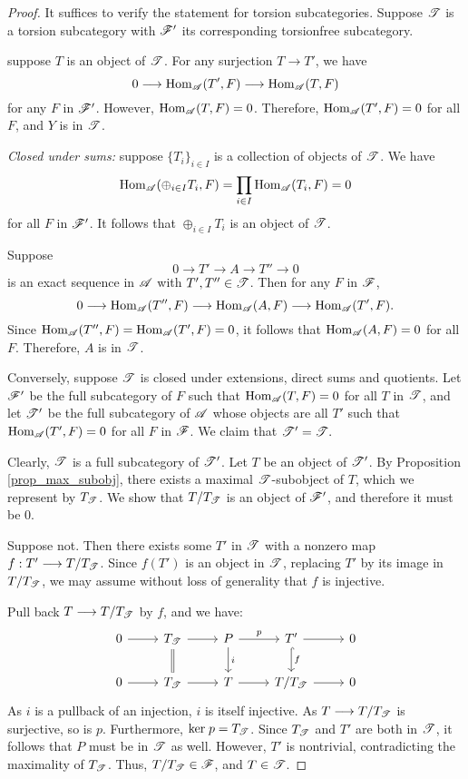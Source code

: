 \begin{proof}
It suffices to verify the statement for torsion subcategories.
Suppose $\mathscr{T}$ is a torsion subcategory with $\mathscr{F}'$ its 
corresponding torsionfree subcategory. 

 suppose $T$ is an object of 
$\mathscr{T}$. For any surjection $T \to T'$, we have 
\[
0 \longrightarrow \mathrm{Hom}_{\mathscr{A}}(T', F) \longrightarrow \mathrm{Hom}_{\mathscr{A}}(T, F)
\]
for any $F$ in $\mathscr{F}'$. However, $\mathrm{Hom}_{\mathscr{A}}(T, F) = 0$.
Therefore, $\mathrm{Hom}_{\mathscr{A}}(T', F) = 0$ for all $F$, and $Y$ is
in $\mathscr{T}$.

\emph{Closed under sums:} suppose $\{T_i\}_{i \in I}$ is a 
collection of objects of $\mathscr{T}$. We have
\[
\mathrm{Hom}_{\mathscr{A}}( \oplus_{i \in I} T_i, F) = \prod_{i \in I}
\mathrm{Hom}_{\mathscr{A}}( T_i, F) = 0
\]
for all $F$ in $\mathscr{F}'$. It follows that $\oplus_{i \in I} T_i$
is an object of $\mathscr{T}$.

 Suppose 
\[
0 \to T' \to A \to T'' \to 0
\]
is an exact sequence in $\mathscr{A}$ with $T', T'' \in \mathscr{T}$.
Then for any $F$ in $\mathscr{F}$, 
\[
0 \longrightarrow \mathrm{Hom}_{\mathscr{A}}(T'', F) \longrightarrow \mathrm{Hom}_{\mathscr{A}}(A, F) \longrightarrow
\mathrm{Hom}_{\mathscr{A}}(T', F).
\]
Since $\mathrm{Hom}_{\mathscr{A}}(T'', F) = \mathrm{Hom}_{\mathscr{A}}(T', F) = 0$,
it follows that $\mathrm{Hom}_{\mathscr{A}}(A, F) = 0$ for all $F$. Therefore, 
$A$ is in $\mathscr{T}$.

Conversely, suppose $\mathscr{T}$ is closed under extensions, direct 
sums and quotients. Let $\mathscr{F}'$ be the full subcategory of $F$ 
such that $\mathrm{Hom}_{\mathscr{A}}(T, F) = 0$ for all $T$ in $\mathscr{T}$, and let 
$\mathscr{T}'$ be the full subcategory of $\mathscr{A}$ whose objects are 
all $T'$ such that $\mathrm{Hom}_{\mathscr{A}}(T', F) = 0$ for all $F$ in 
$\mathscr{F}$. We claim that $\mathscr{T'} = \mathscr{T}.$

Clearly, $\mathscr{T}$ is a full subcategory of $\mathscr{T'}$. Let $T$ be
an object of $\mathscr{T'}$. By Proposition \ref{prop_max_subobj}, there 
exists a maximal $\mathscr{T}$-subobject of $T$, which we represent by
$T_{\mathscr{T}}$. We show that $T/T_{\mathscr{T}}$ is an object of 
$\mathscr{F}'$, and therefore it must be 0.

Suppose not. Then there exists some $T'$ in $\mathscr{T}$ with a 
nonzero map $f: T' \longrightarrow T/T_{\mathscr{T}}$. Since $f(T')$ is an object 
in $\mathscr{T}$, replacing $T'$ by its image in $T/T_{\mathscr{T}}$, we 
may assume without loss of generality that $f$ is injective.

Pull back $T \longrightarrow T/T_{\mathscr{T}}$ by $f$, and we have:
\[
\begin{tikzcd}
0 \arrow{r} &
T_{\Cat{T}} \arrow{r}\arrow[equals]{d} &
P \arrow{r}{p} \arrow{d}{i} &
T' \arrow{r} \arrow[hook]{d}{f} &
0 \\
0 \arrow{r} &
T_{\Cat{T}} \arrow{r} &
T \arrow{r} &
T/T_{\Cat{T}} \arrow{r} &
0
\end{tikzcd}
\]
As $i$ is a pullback of an injection, $i$ is itself injective.
As $T \longrightarrow T/T_{\mathscr{T}}$ is surjective, so is $p$. Furthermore, 
$\mathrm{ker}\; p = T_{\mathscr{T}}$. Since $T_{\mathscr{T}}$ and $T'$
are both in $\mathscr{T}$, it follows that $P$ must be in $\mathscr{T}$ 
as well. However, $T'$ is nontrivial, contradicting the maximality 
of $T_{\mathscr{T}}$. Thus, $T/T_{\mathscr{T}} \in \mathscr{F}$, and $T \in 
\mathscr{T}$.
\end{proof}


